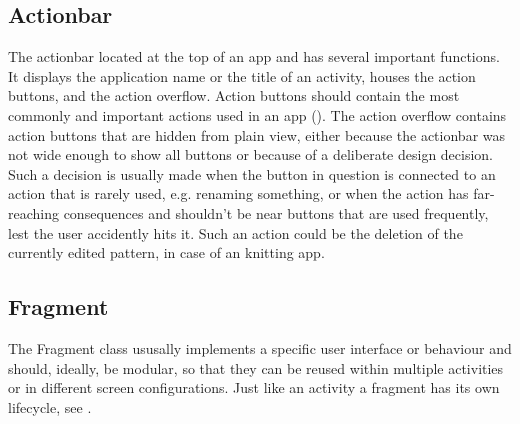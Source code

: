 \subsection{Actionbar}
The actionbar located at the top of an app and has several important functions. It displays the application name or the title of an activity, houses the action buttons, and the action overflow. Action buttons should contain the most commonly and important actions used in an app (\cite{actionbar}). The action overflow contains action buttons that are hidden from plain view, either because the actionbar was not wide enough to show all buttons or because of a deliberate design decision. Such a decision is usually made when the button in question is connected to an action that is rarely used, e.g. renaming something, or when the action has far-reaching consequences and shouldn't be near buttons that are used frequently, lest the user accidently hits it. Such an action could be the deletion of the currently edited pattern, in case of an knitting app. 

\subsection{Fragment}
The Fragment class ususally implements a specific user interface or behaviour and should, ideally, be modular, so that they can be reused within multiple activities or in different screen configurations. Just like an activity a fragment has its own lifecycle, see .

